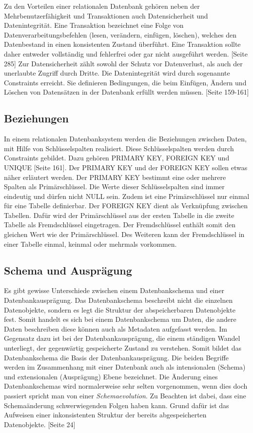 Zu den Vorteilen einer relationalen Datenbank gehören neben der Mehrbenutzerfähigkeit und Transaktionen auch Datensicherheit und Datenintegrität.
Eine Transaktion bezeichnet eine Folge von Datenverarbeitungsbefehlen (lesen, verändern, einfügen, löschen), welches den Datenbestand in einen konsistenten Zustand überführt. Eine Transaktion sollte daher entweder vollständig und fehlerfrei oder gar nicht ausgeführt werden. \cite{Kemper2011}[Seite 285] Zur Datensicherheit zählt sowohl der Schutz vor Datenverlust, als auch der unerlaubte Zugriff durch Dritte. Die Datenintegrität wird durch sogenannte Constraints erreicht. Sie definieren Bedingungen, die beim Einfügen, Ändern und Löschen von Datensätzen in der Datenbank erfüllt werden müssen. \cite{Kemper2011}[Seite 159-161]

\subsection{Beziehungen}
In einem relationalen Datenbanksystem werden die Beziehungen zwischen Daten, mit Hilfe von Schlüsselspalten realisiert.  
Diese Schlüsselspalten werden durch Constraints gebildet. Dazu gehören PRIMARY KEY, FOREIGN KEY und UNIQUE \cite{Kemper2011}[Seite 161]. Der PRIMARY KEY und der FOREIGN KEY sollen etwas näher erläutert werden. Der PRIMARY KEY bestimmt eine oder mehrere Spalten als Primärschlüssel. Die Werte dieser Schlüsselspalten sind immer eindeutig und dürfen nicht NULL sein. Zudem ist eine Primärschlüssel nur einmal für eine Tabelle definierbar. Der FOREIGN KEY dient als Verknüpfung zwischen Tabellen. Dafür wird der Primärschlüssel aus der ersten Tabelle in die zweite Tabelle als Fremdschlüssel eingetragen. Der Fremdschlüssel enthält somit den gleichen Wert wie der Primärschlüssel. Des Weiteren kann der Fremdschlüssel in einer Tabelle einmal, keinmal oder mehrmals vorkommen.

\subsection{Schema und Ausprägung}
Es gibt gewisse Unterschiede zwischen einem Datenbankschema und einer Datenbankausprägung. Das Datenbankschema beschreibt nicht die einzelnen Datenobjekte, sondern es legt die Struktur der abspeicherbaren Datenobjekte fest. Somit handelt es sich bei einem Datenbankschema um Daten, die andere Daten beschreiben diese können auch als Metadaten aufgefasst werden. Im Gegensatz dazu ist bei der Datenbankausprägung, die einem ständigen Wandel unterliegt, der gegenwärtig gespeicherte Zustand zu verstehen. Somit bildet das Datenbankschema die Basis der Datenbankausprägung. Die beiden Begriffe werden im Zusammenhang mit einer Datenbank auch als intensionalen (Schema) und extensionalen (Ausprägung) Ebene bezeichnet. Die Änderung eines Datenbankschemas wird normalerweise sehr selten vorgenommen, wenn dies doch passiert spricht man von einer \textit{Schemaevolution}. Zu Beachten ist dabei, dass eine Schemaänderung schwerwiegenden Folgen haben kann. Grund dafür ist das Aufweisen einer inkonsistenten Struktur der bereits abgespeicherten Datenobjekte. \cite{Kemper2011}[Seite 24]

